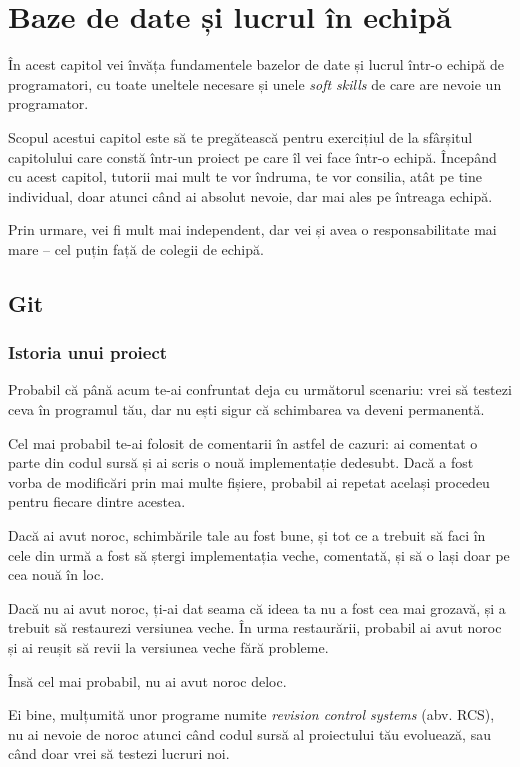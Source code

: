 \chapter{Baze de date și lucrul în echipă}

\begin{chapsummary}
În acest capitol vei învăța fundamentele bazelor de date și lucrul într-o echipă de programatori,
cu toate uneltele necesare și unele \textsl{soft skills} de care are nevoie un programator.

Scopul acestui capitol este să te pregătească pentru exercițiul de la sfârșitul capitolului
care constă într-un proiect pe care îl vei face într-o echipă.
Începând cu acest capitol, tutorii {\phpro} mai mult te vor îndruma, te vor consilia, atât
pe tine individual, doar atunci când ai absolut nevoie, dar mai ales pe întreaga echipă.

Prin urmare, vei fi mult mai independent, dar vei și avea o responsabilitate mai mare --
cel puțin față de colegii de echipă.
\end{chapsummary}

\section{Git}
\subsection{Istoria unui proiect}
Probabil că până acum te-ai confruntat deja cu următorul scenariu: vrei
să testezi ceva în programul tău, dar nu ești sigur că schimbarea
va deveni permanentă.

Cel mai probabil te-ai folosit de comentarii în astfel de cazuri: ai comentat
o parte din codul sursă și ai scris o nouă implementație dedesubt. Dacă a
fost vorba de modificări prin mai multe fișiere, probabil ai repetat același
procedeu pentru fiecare dintre acestea.

Dacă ai avut noroc, schimbările tale au fost bune, și tot ce a trebuit să
faci în cele din urmă a fost să ștergi implementația veche, comentată,
și să o lași doar pe cea nouă în loc.

Dacă nu ai avut noroc, ți-ai dat seama că ideea ta nu a fost cea mai grozavă,
și a trebuit să restaurezi versiunea veche. În urma restaurării, probabil ai
avut noroc și ai reușit să revii la versiunea veche fără probleme.

Însă cel mai probabil, nu ai avut noroc deloc.

Ei bine, mulțumită unor programe numite \textsl{revision control systems}
(abv. RCS),
nu ai nevoie de noroc atunci când codul sursă al proiectului tău evoluează,
sau când doar vrei să testezi lucruri noi.

